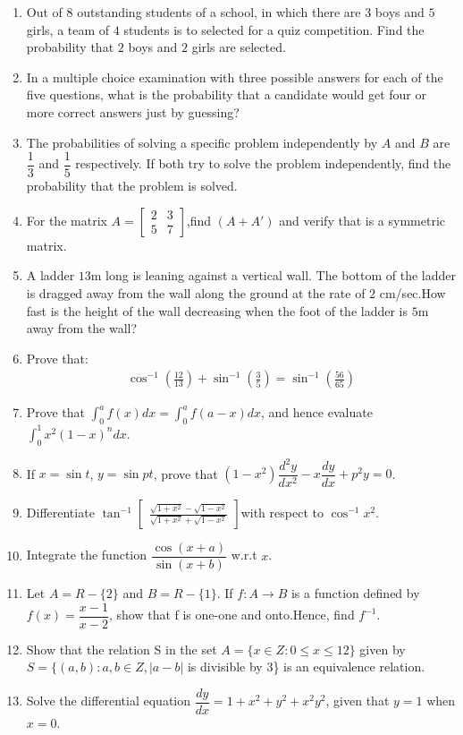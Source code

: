 \documentclass[12pt,-letter paper]{article}
\providecommand{\myvec}[1]{\ensuremath{\begin{bmatrix}#1\end{bmatrix}}}
\providecommand{\brak}[1]{\ensuremath{\left(#1\right)}}
\begin{document}
{\begin{enumerate}
\item Out of $8$ outstanding students of a school, in which there are $3$ boys and $5$ girls, a team of $4$ students is to selected for a quiz competition. Find the probability that $2$ boys and $2$ girls are selected.
\item In a multiple choice examination with three possible answers for each of the five questions, what is the probability that a candidate would get four or more correct answers just by guessing?
\item The probabilities of solving a specific problem independently by $A$ and $B$ are $\dfrac{1}{3}$ and $\dfrac{1}{5}$ respectively. If both try to solve the problem independently, find the probability that the problem is solved.
\item For the matrix $A=\myvec{2 & 3\\5 & 7}$,find $\brak{A+A'}$ and verify that is a symmetric matrix.
\item A ladder $13$m long is leaning against a vertical wall. The bottom of the ladder is dragged away from the wall along the ground at the rate of $2$ cm/sec.How fast is the height of the wall decreasing when the foot of the ladder is $5$m away from the wall?
\item Prove that:\begin{align*}\cos^{-1}{\brak{\frac{12}{13}}}+\sin^{-1}{\brak{\frac{3}{5}}} = \sin^{-1}{\brak{\frac{56}{65}}}\end{align*}
	\item Prove that $\int_{0}^{a} f{\brak{x}} dx = \int_{0}^{a} f{\brak{a-x}} dx$, and hence evaluate $\int_{0}^{1} x^2{\brak{1-x}}^n dx$.
\item If $x=\sin t$, $ y=\sin pt$, prove that $(1-x^2)\dfrac{d^2 y}{d x^2}-x\dfrac{dy}{dx}+p^2 y=0$.
\item Differentiate $\tan^{-1}\myvec{\frac{\sqrt{1+x^2}-\sqrt{1-x^2}}{\sqrt{1+x^2}+\sqrt{1-x^2}}} $with respect to $\cos^{-1} x^2$.
\item Integrate the function $\dfrac{\cos{\brak{x+a}}}{\sin{\brak{x+b}}}$ w.r.t $x$.
\item Let $A=R-\{2\}$ and $B=R-\{1\}$. If $f:A \rightarrow B$ is a function defined by $f({x})=\dfrac{x-1}{x-2}$, show that f is one-one and onto.Hence, find $f^{-1}$.
\item Show that the relation S in the  set $ A=\{ x \in Z : 0 \leq x \leq 12\} $ given by $ S = \{(a,b) :a,b \in Z,|a-b|$ is divisible by $3$\}  is an equivalence relation.
\item Solve the differential equation $\dfrac{dy}{dx} = 1+x^{2}+ y^{2}+x^{2}y^{2}$, given that $y=1$ when $x=0$.

\end{enumerate}}
\end{document}
